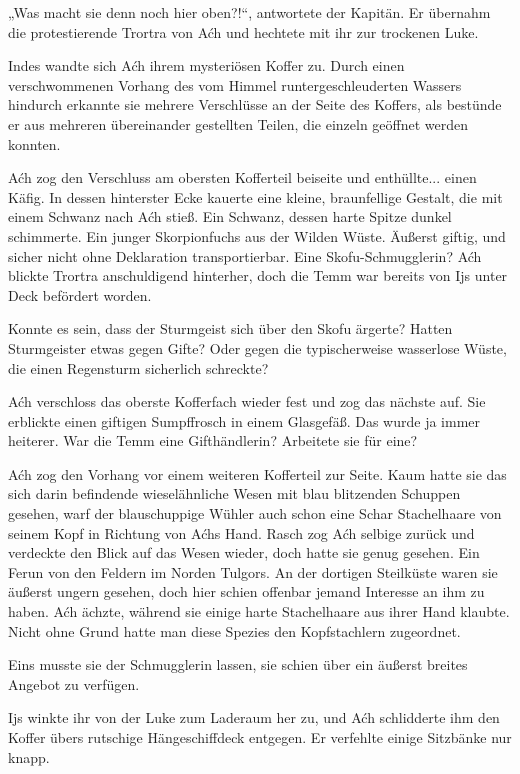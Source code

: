 „Was macht sie denn noch hier oben?!“, antwortete der Kapitän. Er übernahm die protestierende Trortra von Aćh und hechtete mit ihr zur trockenen Luke.

Indes wandte sich Aćh ihrem mysteriösen Koffer zu. Durch einen verschwommenen Vorhang des vom Himmel runtergeschleuderten Wassers hindurch erkannte sie mehrere Verschlüsse an der Seite des Koffers, als bestünde er aus mehreren übereinander gestellten Teilen, die einzeln geöffnet werden konnten.

Aćh zog den Verschluss am obersten Kofferteil beiseite und enthüllte... einen Käfig. In dessen hinterster Ecke kauerte eine kleine, braunfellige Gestalt, die mit einem Schwanz nach Aćh stieß. Ein Schwanz, dessen harte Spitze dunkel schimmerte. Ein junger Skorpionfuchs aus der Wilden Wüste. Äußerst giftig, und sicher nicht ohne Deklaration transportierbar. Eine Skofu-Schmugglerin? Aćh blickte Trortra anschuldigend hinterher, doch die Temm war bereits von Ijs unter Deck befördert worden.

Konnte es sein, dass der Sturmgeist sich über den Skofu ärgerte? Hatten Sturmgeister etwas gegen Gifte? Oder gegen die typischerweise wasserlose Wüste, die einen Regensturm sicherlich schreckte?

Aćh verschloss das oberste Kofferfach wieder fest und zog das nächste auf. Sie erblickte einen giftigen Sumpffrosch in einem Glasgefäß. Das wurde ja immer heiterer. War die Temm eine Gifthändlerin? Arbeitete sie für eine?

Aćh zog den Vorhang vor einem weiteren Kofferteil zur Seite. Kaum hatte sie das sich darin befindende wieselähnliche Wesen mit blau blitzenden Schuppen gesehen, warf der blauschuppige Wühler auch schon eine Schar Stachelhaare von seinem Kopf in Richtung von Aćhs Hand. Rasch zog Aćh selbige zurück und verdeckte den Blick auf das Wesen wieder, doch hatte sie genug gesehen. Ein Ferun von den Feldern im Norden Tulgors. An der dortigen Steilküste waren sie äußerst ungern gesehen, doch hier schien offenbar jemand Interesse an ihm zu haben. Aćh ächzte, während sie einige harte Stachelhaare aus ihrer Hand klaubte. Nicht ohne Grund hatte man diese Spezies den Kopfstachlern zugeordnet.

Eins musste sie der Schmugglerin lassen, sie schien über ein äußerst breites Angebot zu verfügen.

Ijs winkte ihr von der Luke zum Laderaum her zu, und Aćh schlidderte ihm den Koffer übers rutschige Hängeschiffdeck entgegen. Er verfehlte einige Sitzbänke nur knapp.

